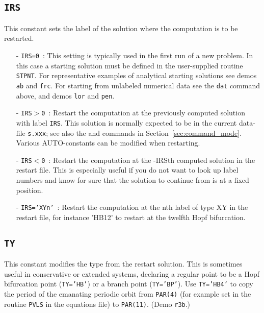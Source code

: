 \documentclass[12pt]{report}
\begin{document}
\subsection{\texttt{IRS}}  \label{sec:IRS}
This constant sets the label of the solution where the computation
is to be restarted.
\begin{itemize}
\item[-] {\tt IRS=0}~:  
  This setting is typically used in the first run of a new problem.
  In this case a starting solution must be defined in the user-supplied
  routine {\tt STPNT}.
  For representative examples of analytical starting solutions 
  see demos {\tt ab} and {\tt frc}.
  For starting from unlabeled numerical data see the {\tt dat} command
  above, and demos {\tt lor} and {\tt pen}.
  
\item[-] {\tt IRS$>$0}~: 
  Restart the computation at the previously computed solution with label {\tt IRS}. 
  This solution is normally expected to be in the current data-file 
 {\tt s.xxx}; see also the  and  commands in 
 Section~\ref{sec:command_mode}.
 Various {\cal AUTO}-constants can be modified when restarting.

\item[-] {\tt IRS$<$0}~:
  Restart the computation at the -IRSth computed solution in the
  restart file. This is especially useful if you do not want to look
  up label numbers and know for sure that the solution to continue
  from is at a fixed position.
\item[-] {\tt IRS='XYn'}~:
  Restart the computation at the nth label of type XY in the
  restart file, for instance 'HB12' to restart at the twelfth Hopf
  bifurcation.
\end{itemize}

\subsection{\texttt{TY}} \label{sec:TY} 
 This constant modifies the type from the restart solution.
 This is sometimes useful in conservative or extended systems,
 declaring a regular point to be a Hopf bifurcation point ({\tt TY='HB'}) or a
 branch point ({\tt TY='BP'}). Use {\tt TY='HB4'} to copy the period
 of the emanating periodic orbit from {\tt PAR(4)} (for example set in
 the routine {\tt PVLS} in the equations file) to {\tt PAR(11)}.
 (Demo {\tt r3b}.)
\end{document}
